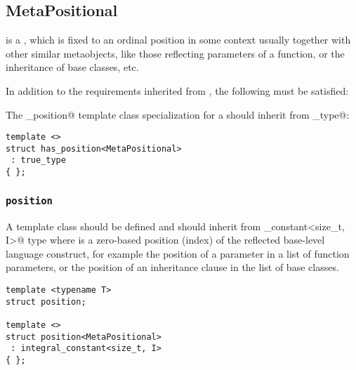 \subsection{MetaPositional}
\label{concept-MetaPositional}

 is a , which is fixed to an ordinal position in some context
usually together with other similar metaobjects, like those reflecting parameters of a function,
or the inheritance of base classes, etc.

In addition to the requirements inherited from ,
the following must be satisfied:

The \verb@has_position@ template class specialization for a  should
inherit from \verb@true_type@:

\begin{verbatim}
template <>
struct has_position<MetaPositional>
 : true_type
{ };
\end{verbatim}

\subsubsection{\texttt{position}}

A template class \verb@position@ should be defined and should
inherit from \verb@integral_constant<size_t, I>@ type where \verb@I@ is
a zero-based position (index) of the reflected base-level language construct,
for example the position of a parameter in a list of function parameters,
or the position of an inheritance clause in the list of base classes.

\begin{verbatim}
template <typename T>
struct position;

template <>
struct position<MetaPositional>
 : integral_constant<size_t, I>
{ };
\end{verbatim}

